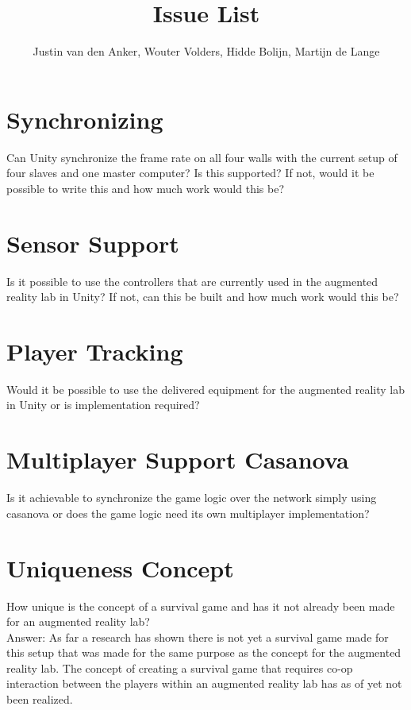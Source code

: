 \documentclass[10pt,a4paper]{article}
\author{Justin van den Anker, Wouter Volders, Hidde Bolijn, Martijn de Lange}
\title{Issue List}
\begin{document}
\maketitle
\section{Synchronizing}
Can Unity synchronize the frame rate on all four walls with the current setup of four slaves and one master computer? Is this supported? If not, would it be possible to write this and how much work would this be?

\section{Sensor Support}
Is it possible to use the controllers that are currently used in the augmented reality lab in Unity? If not, can this be built and how much work would this be?

\section{Player Tracking}
Would it be possible to use the delivered equipment for the augmented reality lab in Unity or is implementation required?


\section{Multiplayer Support Casanova}
Is it achievable to synchronize the game logic over the network simply using casanova or does the game logic need its own multiplayer implementation?

\section{Uniqueness Concept}
How unique is the concept of a survival game and has it not already been made for an augmented reality lab?
\\

Answer: As far a research has shown there is not yet a survival game made for this setup that was made for the same purpose as the concept for the augmented reality lab. The concept of creating a survival game that requires co-op interaction between the players within an augmented reality lab has as of yet not been realized.
\end{document}

